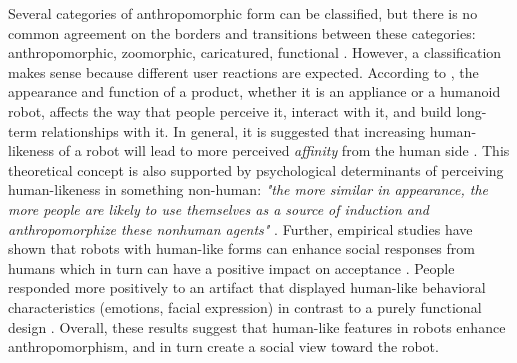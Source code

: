 \documentclass{frontiersSCNS} %
\begin{document}
Several categories of anthropomorphic form can be classified, but there is no common agreement on the borders and transitions between these categories: anthropomorphic, zoomorphic, caricatured, functional \citep{fong_survey_2003}. However, a classification makes sense because different user reactions are expected. According to \cite{bartneck_shaping_2004}, the appearance and function of a product, whether it is an appliance or a humanoid robot, affects the way that people perceive it, interact with it, and build long-term relationships with it. In general, it is suggested that increasing human-likeness of a robot will lead to more perceived \textit{affinity} from the human side \citep{mori_uncanny_1970}. This theoretical concept is also supported by psychological determinants of perceiving human-likeness in something non-human: \textit{"the more similar in appearance, the more people are likely to use themselves as a source of induction and anthropomorphize these nonhuman agents"} \citep{epley_seeing_2007}. Further, empirical studies have shown that robots with human-like forms can enhance social responses from humans which in turn can have a positive impact on acceptance \citep{duffy_anthropomorphism_2003,goetz_cooperation_2002,venkatesh_theoretical_2000}. People responded more positively to an artifact that displayed human-like behavioral characteristics (emotions, facial expression) in contrast to a purely functional design \citep{eyssel_anthropomorphic_2010,krach_can_2008,reeves_media_1996,riek_how_2009}. Overall, these results suggest that human-like features in robots enhance anthropomorphism, and in turn create a social view toward the robot.
\end{document}
